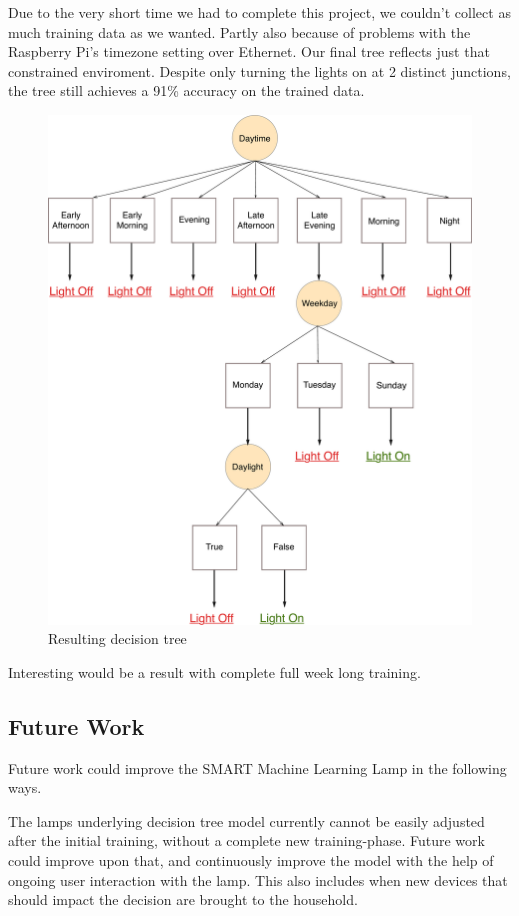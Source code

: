 
Due to the very short time we had to complete this project, we couldn't collect as much training data as we wanted. Partly also because of problems with the Raspberry Pi's timezone setting over Ethernet. Our final tree reflects just that constrained enviroment. Despite only turning the lights on at 2 distinct junctions, the tree still achieves a 91\% accuracy on the trained data.

\begin{figure}
  \centering
    \includegraphics[width=1.0\textwidth]{img/tree.pdf}
  \caption{Resulting decision tree}
  \label{fig:result}
\end{figure}

Interesting would be a result with complete full week long training.

\subsection{Future Work}

Future work could improve the SMART Machine Learning Lamp in the following ways.

The lamps underlying decision tree model currently cannot be easily adjusted after the initial training, without a complete new training-phase. Future work could improve upon that, and continuously improve the model with the help of ongoing user interaction with the lamp. This also includes when new devices that should impact the decision are brought to the household.




